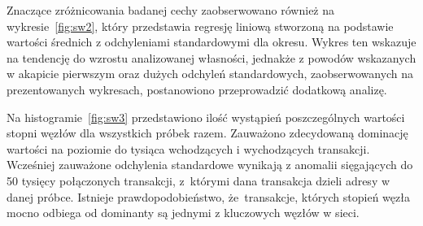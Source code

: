 \documentclass[12pt, oneside, final, openany]{mgr}
\begin{document}
\indent Znaczące zróżnicowania badanej cechy zaobserwowano również na wykresie~\ref{fig:sw2}, który przedstawia regresję liniową stworzoną na podstawie wartości średnich z odchyleniami standardowymi dla okresu. Wykres ten wskazuje na tendencję do wzrostu analizowanej własności, jednakże z powodów wskazanych w akapicie pierwszym oraz dużych odchyleń standardowych, zaobserwowanych na prezentowanych wykresach, postanowiono przeprowadzić dodatkową analizę.

\indent Na histogramie~\ref{fig:sw3} przedstawiono ilość wystąpień poszczególnych wartości stopni węzłów dla wszystkich próbek razem. Zauważono zdecydowaną dominację wartości na poziomie do tysiąca wchodzących i wychodzących transakcji. Wcześniej zauważone odchylenia standardowe wynikają z anomalii sięgających do 50 tysięcy połączonych transakcji, z~którymi dana transakcja dzieli adresy w danej próbce. Istnieje prawdopodobieństwo, że~transakcje, których stopień węzła mocno odbiega od dominanty są jednymi z kluczowych węzłów w sieci.
\end{document}
